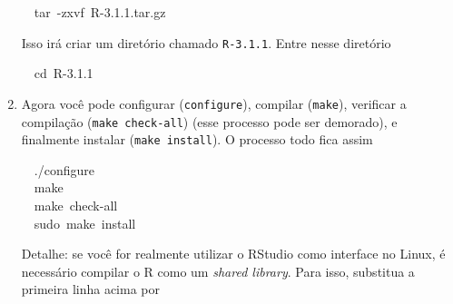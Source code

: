 \documentclass[a4paper,12pt]{article}\usepackage[]{graphicx}\usepackage[]{color}
\makeatletter
\newcommand{\hlnum}[1]{\textcolor[rgb]{0.686,0.059,0.569}{#1}}%
\newcommand{\hlopt}[1]{\textcolor[rgb]{0,0,0}{#1}}%
\newcommand{\hlstd}[1]{\textcolor[rgb]{0.345,0.345,0.345}{#1}}%
\newcommand{\hlkwb}[1]{\textcolor[rgb]{0.69,0.353,0.396}{#1}}%
\newcommand{\hlkwc}[1]{\textcolor[rgb]{0.333,0.667,0.333}{#1}}%
\newenvironment{kframe}{%
 \def\at@end@of@kframe{}%
 \ifinner\ifhmode%
  \def\at@end@of@kframe{\end{minipage}}%
  \begin{minipage}{\columnwidth}%
 \fi\fi%
 \def\FrameCommand##1{\hskip\@totalleftmargin \hskip-\fboxsep
 \colorbox{shadecolor}{##1}\hskip-\fboxsep
     \hskip-\linewidth \hskip-\@totalleftmargin \hskip\columnwidth}%
 \MakeFramed {\advance\hsize-\width
   \@totalleftmargin\z@ \linewidth\hsize
   \@setminipage}}%
 {\par\unskip\endMakeFramed%
 \at@end@of@kframe}
\newenvironment{knitrout}{}{} %
\providecommand{\R}{\textsf{R}\xspace}
\providecommand{\RStudio}{\textsf{RStudio}\xspace}
\makeatother
\begin{document}
\begin{enumerate}
\begin{knitrout}\small
{}\color{fgcolor}\begin{kframe}
\noindent
\ttfamily
\hlstd{}\hlstd{\ \ }\hlstd{}\hlkwc{tar\ }\hlstd{}\hlopt{{-}}\hlstd{zxvf\ R}\hlopt{{-}}\hlstd{}\hlnum{3.1.1}\hlstd{.}\hlkwc{tar}\hlstd{.gz}\hspace*{\fill}
\mbox{}
\normalfont
\normalsize
\end{kframe}
\end{knitrout}
  Isso irá criar um diretório chamado \texttt{R-3.1.1}. Entre nesse
  diretório
\begin{knitrout}\small
{}\color{fgcolor}\begin{kframe}
\noindent
\ttfamily
\hlstd{}\hlstd{\ \ }\hlstd{}\hlkwb{cd\ }\hlstd{R}\hlopt{{-}}\hlstd{}\hlnum{3.1.1}\hlstd{}\hspace*{\fill}
\mbox{}
\normalfont
\normalsize
\end{kframe}
\end{knitrout}
\item Agora você pode configurar (\texttt{configure}), compilar
  (\texttt{make}), verificar a compilação (\texttt{make check-all})
  (esse processo pode ser demorado), e finalmente instalar (\texttt{make
  install}). O processo todo fica assim
\begin{knitrout}\small
{}\color{fgcolor}\begin{kframe}
\noindent
\ttfamily
\hlstd{}\hlstd{\ \ }\hlstd{.}\hlopt{/}\hlstd{configure\hspace*{\fill}\\
}\hlstd{\ \ }\hlstd{}\hlkwc{make}\hspace*{\fill}\\
\hlstd{}\hlstd{\ \ }\hlstd{}\hlkwc{make\ }\hlstd{check}\hlopt{{-}}\hlstd{all\hspace*{\fill}\\
}\hlstd{\ \ }\hlstd{sudo\ }\hlkwc{make\ install}\hlstd{}\hspace*{\fill}
\mbox{}
\normalfont
\normalsize
\end{kframe}
\end{knitrout}
  Detalhe: se você for realmente utilizar o \RStudio como interface no
  Linux, é necessário compilar o \R como um \textit{shared
    library}. Para isso, substitua a primeira linha acima por
\begin{knitrout}\small
{}\color{fgcolor}\begin{kframe}

\end{kframe}
\end{knitrout}
\end{enumerate}
\end{document}
